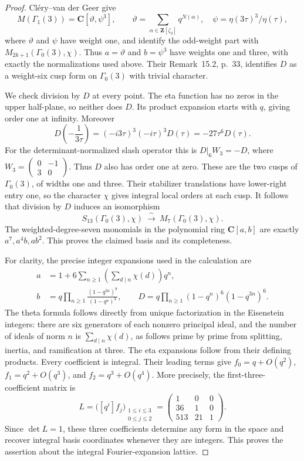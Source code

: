 \documentclass[11pt,a4paper]{article}
\theoremstyle{definition}
\begin{document}
\begin{proof}
Cl\'ery--van der Geer
\cite[paragraph on $\Gamma_1(3)$, p.~12]{K17CleryVanDerGeer2022}
give
\[
 M(\Gamma_1(3))=\mathbf C[\vartheta,\psi^3],\qquad
 \vartheta=\sum_{\alpha\in\mathbf Z[\zeta_3]}q^{N(\alpha)},\quad
 \psi=\eta(3\tau)^3/\eta(\tau),
\]
where $\vartheta$ and $\psi$ have weight one, and identify the odd-weight
part with $M_{2k+1}(\Gamma_0(3),\chi)$. Thus $a=\vartheta$ and $b=\psi^3$
have weights one and three, with exactly the normalizations used above.
Their Remark~15.2, p.~33, identifies $D$ as a weight-six cusp form on
$\Gamma_0(3)$ with trivial character.

We check division by $D$ at every point. The eta function has no zeros
in the upper half-plane, so neither does $D$. Its product expansion starts
with $q$, giving order one at infinity. Moreover
\[
 D\!\left(-\frac1{3\tau}\right)
 =(-i3\tau)^3(-i\tau)^3D(\tau)
 =-27\tau^6D(\tau).
\]
For the determinant-normalized slash operator this is
$D|_6W_3=-D$, where
$W_3=\left(\begin{smallmatrix}0&-1\\3&0\end{smallmatrix}\right)$.
Thus $D$ also has order one at zero. These are the two cusps of
$\Gamma_0(3)$, of widths one and three. Their stabilizer translations
have lower-right entry one, so the character $\chi$ gives integral local
orders at each cusp. It follows that division by $D$ induces an
isomorphism
\[
 S_{13}(\Gamma_0(3),\chi)\ \xrightarrow{\ \sim\ }\
 M_7(\Gamma_0(3),\chi).
\]
The weighted-degree-seven monomials in the polynomial ring
$\mathbf C[a,b]$ are exactly $a^7,a^4b,ab^2$. This proves the claimed
basis and its completeness.

For clarity, the precise integer expansions used in the calculation are
\begin{align}
 a&=1+6\sum_{n\ge1}\left(\sum_{d\mid n}\chi(d)\right)q^n,
 \label{eq:gl2-theta-expansion}\\
 b&=q\prod_{n\ge1}\frac{(1-q^{3n})^9}{(1-q^n)^3},\qquad
 D=q\prod_{n\ge1}(1-q^n)^6(1-q^{3n})^6.
 \label{eq:gl2-eta-expansion}
\end{align}
The theta formula follows directly from unique factorization in the
Eisenstein integers: there are six generators of each nonzero principal
ideal, and the number of ideals of norm $n$ is
$\sum_{d\mid n}\chi(d)$, as follows prime by prime from splitting,
inertia, and ramification at three. The eta expansions follow from their
defining products. Every coefficient is integral. Their leading terms
give $f_0=q+O(q^2)$, $f_1=q^2+O(q^3)$, and
$f_2=q^3+O(q^4)$. More precisely, the first-three-coefficient matrix is
\[
 L=\bigl([q^i]f_j\bigr)_{\substack{1\le i\le3\\0\le j\le2}}
   =\begin{pmatrix}1&0&0\\36&1&0\\513&21&1\end{pmatrix}.
\]
Since $\det L=1$, these three coefficients determine any form in the
space and recover integral basis coordinates whenever they are integers.
This proves the assertion about the integral Fourier-expansion lattice.


\end{proof}
\end{document}
